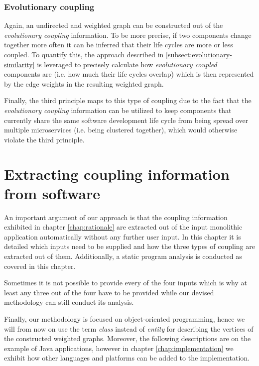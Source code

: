 \documentclass[12pt,a4paper]{report}
\begin{document}
\subsection{Evolutionary coupling}

Again, an undirected and weighted graph can be constructed out of the
\textit{evolutionary coupling} information.
To be more precise, if two components change together more often it can be
inferred that their life cycles are more or less coupled.
To quantify this, the approach described in \ref{subsect:evolutionary-similarity}
is leveraged to precisely calculate how \textit{evolutionary coupled} components
are (i.e. how much their life cycles overlap) which is then represented
by the edge weights in the resulting weighted graph.

Finally, the third principle maps to this type of coupling due to the fact that
the \textit{evolutionary coupling} information can be utilized to keep
components that currently share the same software development life cycle
from being spread over multiple microservices (i.e. being clustered together),
which would otherwise violate the third principle.




\chapter{Extracting coupling information from software} \label{chap:extracting-coupling}

An important argument of our approach is that the coupling information
exhibited in chapter \ref{chap:rationale} are extracted out of the input
monolithic application automatically without any further user input.
In this chapter it is detailed which inputs need to be supplied and
how the three types of coupling are extracted out of them. Additionally,
a static program analysis is conducted as covered in this chapter.

Sometimes it is not possible to provide every of the four inputs which is why
at least any three out of the four have to be provided while our devised
methodology can still conduct its analysis.

Finally, our methodology is focused on object-oriented programming,
hence we will from now on use the term \textit{class} instead of \textit{entity}
for describing the vertices of the constructed weighted graphs.
Moreover, the following descriptions are on the example of Java applications,
however in chapter \ref{chap:implementation} we exhibit how other
languages and platforms can be added to the implementation.
\end{document}
